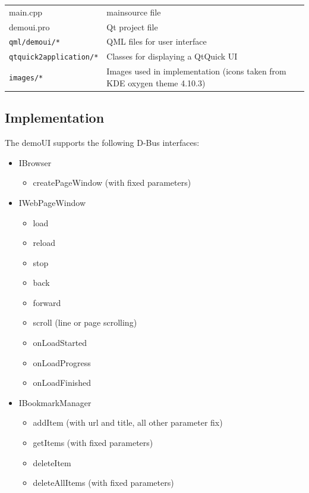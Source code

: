 \documentclass{pelagicore}
\begin{document}
\begin{tabularx}{0.9\textwidth}{l X}
    main.cpp                    & mainsource file \\
    demoui.pro                  & Qt project file \\
    {\tt qml/demoui/*}          & QML files for user interface \\
    {\tt qtquick2application/*} & Classes for displaying a QtQuick UI \\
    {\tt images/*}              & Images used in implementation (icons taken
                                  from KDE oxygen theme 4.10.3)
\end{tabularx}

\subsection{Implementation}
The demoUI supports the following D-Bus interfaces:
\begin{itemize}
    \item IBrowser
    \begin{itemize}
        \item createPageWindow (with fixed parameters)
    \end{itemize}
    \item IWebPageWindow
    \begin{itemize}
        \item load
        \item reload
        \item stop
        \item back
        \item forward
        \item scroll (line or page scrolling)
        \item onLoadStarted
        \item onLoadProgress
        \item onLoadFinished
    \end{itemize}
    \item IBookmarkManager
    \begin{itemize}
        \item addItem (with url and title, all other parameter fix)
        \item getItems (with fixed parameters)
        \item deleteItem
        \item deleteAllItems (with fixed parameters)
    \end{itemize}
\end{itemize}
\end{document}
